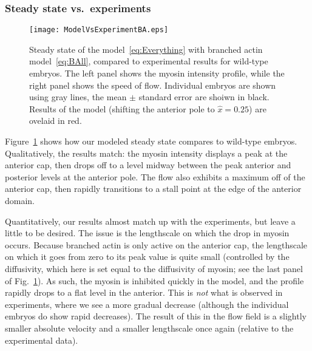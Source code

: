 \documentclass[11pt]{article}
\newcommand{\red}[1]{\color{red}#1\normalcolor}
\newcommand{\6}[1]{#1_{\text{6}}}
\newcommand{\3}[1]{#1_{\text{3}}}
\begin{document}
\subsubsection{Steady state vs.\ experiments}

\begin{figure}
\centering
\texttt{[image: ModelVsExperimentBA.eps]}
\caption{\label{fig:StStBA}Steady state of the model\ \eqref{eq:Everything} with branched actin model\ \eqref{eq:BAll}, compared to experimental results for wild-type embryos. The left panel shows the myosin intensity profile, while the right panel shows the speed of flow. Individual embryos are shown using gray lines, the mean $\pm$ standard error are shoiwn in black. Results of the model (shifting the anterior pole to $\hat x = 0.25$) are ovelaid in red.}
\end{figure}

Figure\ \ref{fig:StStBA} shows how our modeled steady state compares to wild-type embryos. Qualitatively, the results match: the myosin intensity displays a peak at the anterior cap, then drops off to a level midway between the peak anterior and posterior levels at the anterior pole. The flow also exhibits a maximum off of the anterior cap, then rapidly transitions to a stall point at the edge of the anterior domain.

\red{Quantitatively, our results almost match up with the experiments, but leave a little to be desired. The issue is the lengthscale on which the drop in myosin occurs. Because branched actin is only active on the anterior cap, the lengthscale on which it goes from zero to its peak value is quite small (controlled by the diffusivity, which here is set equal to the diffusivity of myosin; see the last panel of Fig.\ \ref{fig:StStBA}). As such, the myosin is inhibited quickly in the model, and the profile rapidly drops to a flat level in the anterior. This is \emph{not} what is observed in experiments, where we see a more gradual decrease (although the individual embryos do show rapid decreases). The result of this in the flow field is a slightly smaller absolute velocity and a smaller lengthscale once again (relative to the experimental data).}




\end{document}
